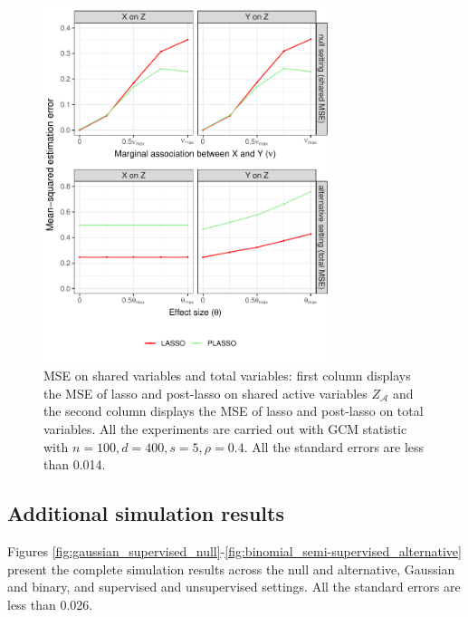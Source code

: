 \documentclass[aos]{imsart}
\theoremstyle{definition}
\theoremstyle{remark}
\begin{document}
\begin{figure}[!ht]
	\centering
	\includegraphics[width = 0.75\textwidth]{figures/MSE.pdf}
	\caption{MSE on shared variables and total variables: first column displays the MSE of lasso and post-lasso on shared active variables $Z_{\mathcal{A}}$ and the second column displays the MSE of lasso and post-lasso on total variables. All the experiments are carried out with GCM statistic with $n=100,d=400,s=5,\rho=0.4$. All the standard errors are less than 0.014.}
	\label{fig:MSE}
\end{figure}

\subsection{Additional simulation results} \label{sec:additional-simulation-results}

Figures \ref{fig:gaussian_supervised_null}-\ref{fig:binomial_semi-supervised_alternative} present the complete simulation results across the null and alternative, Gaussian and binary, and supervised and unsupervised settings. All the standard errors are less than 0.026.
\end{document}
